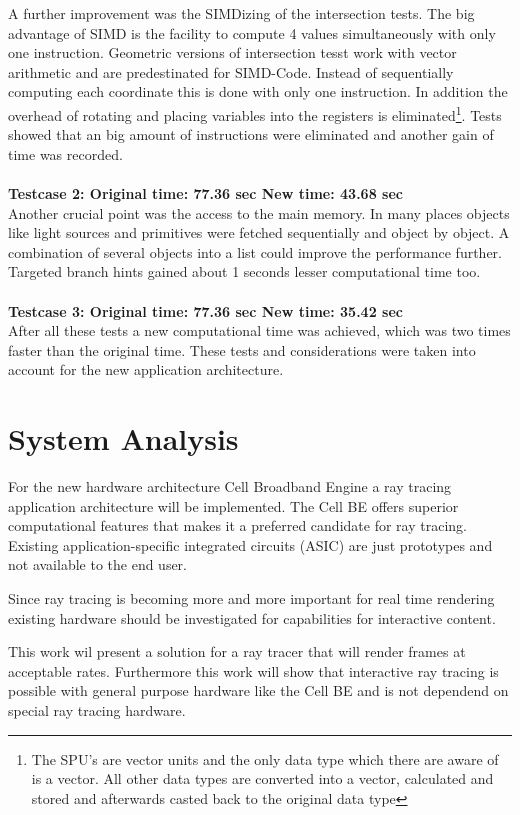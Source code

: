\documentclass[DIV10, abstracton, openright, footsepline, headsepline, twoside, 9pt,
bigheadings]{scrreprt}
\begin{document}
A further improvement was the SIMDizing of the intersection tests. The big
advantage of SIMD is the facility to compute 4 values simultaneously with only
one instruction.
Geometric versions of intersection tesst work with vector arithmetic and are
predestinated for SIMD-Code. Instead of sequentially computing each coordinate
this is done with only one instruction. In addition the overhead of rotating
and placing variables into the registers is eliminated\footnote{The
SPU's are vector units and the only data type which there are aware of is a
vector. All other data types are converted into a vector, calculated and
stored and afterwards casted back to the original data type}.
Tests showed that an big amount of instructions were eliminated and
another gain of time was recorded.\\\\
\textbf{Testcase 2: Original time: 77.36 sec New time: 43.68 sec}\\

Another crucial point was the access to the main memory. In many places objects
like light sources and primitives were fetched sequentially and object by object.
A combination of several objects into a list could improve the performance
further. Targeted branch hints gained about 1 seconds lesser
computational time too.\\\\
\textbf{Testcase 3: Original time: 77.36 sec New time: 35.42 sec}\\
After all these tests a new computational time was achieved, which was two times
faster than the original time. These tests and considerations were taken into
account for the new application architecture.



\chapter{System Analysis}
For the new hardware architecture Cell Broadband Engine a ray tracing
application architecture will be implemented. The Cell BE offers superior
computational features that makes it a preferred candidate for ray tracing.
Existing application-specific integrated circuits (ASIC) are just prototypes
and not available to the end user.

Since ray tracing is becoming more and more important for
real time rendering existing hardware should be investigated for capabilities
for interactive content.

This work wil present a solution for a ray tracer that will render frames at
acceptable rates. Furthermore this work will show that interactive ray tracing
is possible with general purpose hardware like the Cell BE and is not dependend
on special ray tracing hardware.
\end{document}
